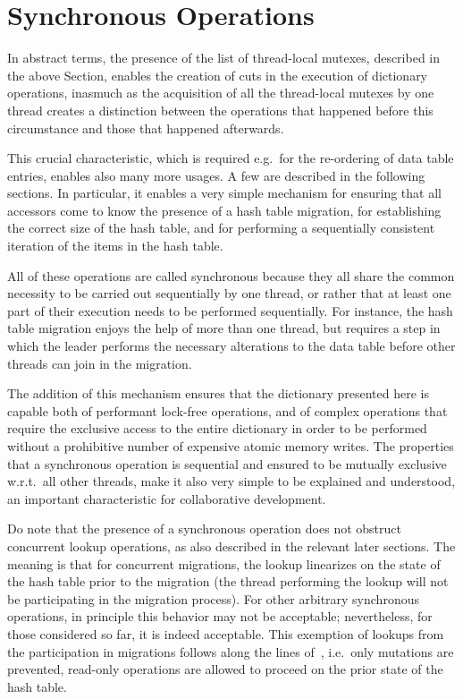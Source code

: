 \section{Synchronous Operations}\label{sec:synchronous-operations}

In abstract terms, the presence of the list of thread-local mutexes, described in the above Section, enables the creation of cuts in the execution of dictionary operations, inasmuch as the acquisition of all the thread-local mutexes by one thread creates a distinction between the operations that happened before this circumstance and those that happened afterwards.

This crucial characteristic, which is required e.g.\ for the re-ordering of data table entries, enables also many more usages.
A few are described in the following sections.
In particular, it enables a very simple mechanism for ensuring that all accessors come to know the presence of a hash table migration, for establishing the correct size of the hash table, and for performing a sequentially consistent iteration of the items in the hash table.

All of these operations are called synchronous because they all share the common necessity to be carried out sequentially by one thread, or rather that at least one part of their execution needs to be performed sequentially.
For instance, the hash table migration enjoys the help of more than one thread, but requires a step in which the leader performs the necessary alterations to the data table before other threads can join in the migration.

The addition of this mechanism ensures that the dictionary presented here is capable both of performant lock-free operations, and of complex operations that require the exclusive access to the entire dictionary in order to be performed without a prohibitive number of expensive atomic memory writes.
The properties that a synchronous operation is sequential and ensured to be mutually exclusive w.r.t.\ all other threads, make it also very simple to be explained and understood, an important characteristic for collaborative development.

Do note that the presence of a synchronous operation does not obstruct concurrent lookup operations, as also described in the relevant later sections.
The meaning is that for concurrent migrations, the lookup linearizes on the state of the hash table prior to the migration (the thread performing the lookup will not be participating in the migration process).
For other arbitrary synchronous operations, in principle this behavior may not be acceptable; nevertheless, for those considered so far, it is indeed acceptable.
This exemption of lookups from the participation in migrations follows along the lines of~\cite[\S5.3.2, Preventing Concurrent Updates to Ensure Consistency]{maier}, i.e.\ only mutations are prevented, read-only operations are allowed to proceed on the prior state of the hash table.


